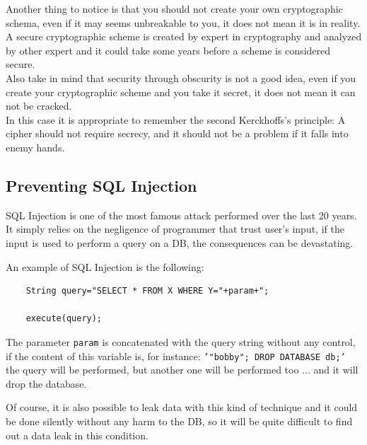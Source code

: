 Another thing to notice is that you should not create your own cryptographic schema, even if it may seems unbreakable to you, it does not mean it is in reality.\\
A secure cryptographic scheme is created by expert in cryptography and analyzed by other expert and it could take some years before a scheme is considered secure.\\
Also take in mind that security through obscurity is not a good idea, even if you create your cryptographic scheme and you take it secret, it does not mean it can not be cracked.\\
In this case it is appropriate to remember the second Kerckhoffs's principle:
A cipher should not require secrecy, and it should not be a problem if it falls into enemy hands.\\

\subsection{Preventing SQL Injection}
SQL Injection is one of the most famous attack performed over the last 20 years.\newline
It simply relies on the negligence of programmer that trust user's input, if the input is used to perform
a query on a DB, the consequences can be devastating.\newline

An example of SQL Injection is the following:

\begin{lstlisting}
	String query="SELECT * FROM X WHERE Y="+param+";
	
	execute(query);
\end{lstlisting} 

The parameter \texttt{param} is concatenated with the query string without any control, if the content of this variable is, for instance:
\texttt{'"bobby"; DROP DATABASE db;'} the query will be performed, but another one will be performed too ... and it will drop the database.\newline

Of course, it is also possible to leak data with this kind of technique and it could be done silently without any harm to the DB, so it will be quite difficult to
find out a data leak in this condition.\newline

